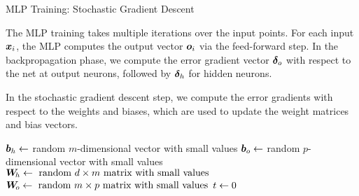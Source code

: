 \begin{frame}{MLP Training: Stochastic Gradient Descent}

The MLP training takes multiple iterations over the input points. For
each input ${\boldsymbol x}_i$, the MLP computes the output vector ${\boldsymbol o}_i$ via the
feed-forward step. In the backpropagation phase, we compute the error
gradient vector ${\bm \delta}_o$ with respect to the net at output neurons,
followed by ${\bm \delta}_h$ for hidden neurons. 

\medskip

In the stochastic gradient descent
step, we compute the error gradients with respect to the weights and
biases, which are used to update the weight matrices and bias vectors.

\medskip

\begin{tightalgo}[H]{\textwidth-18pt}
\Algorithm{}
${\boldsymbol b}_{h} \leftarrow$ random $m$-dimensional vector with small
values\; 
${\boldsymbol b}_{o} \leftarrow$ random $p$-dimensional vector with small
values\;
${\boldsymbol W}_{\!h} \leftarrow \text{ random } d \times m \text{ matrix with small
values}$\;
${\boldsymbol W}_{\!o} \leftarrow  \text{ random } m \times p \text{ matrix with small
values}$\;
$t \leftarrow 0$ \;
\end{tightalgo}
\end{frame}

